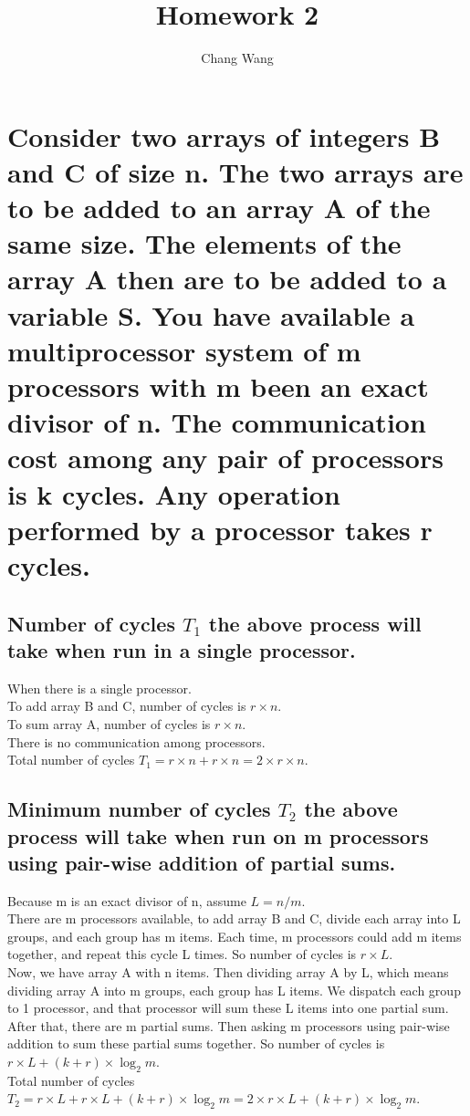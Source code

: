 \documentclass[12pt, a4paper]{report}
\title{Homework 2}
\author{Chang Wang}
\begin{document}
\maketitle

\section{Consider two arrays of integers B and C of size n. The two arrays are to be added to an array A of the same size. The elements of the array A then are to be added to a variable S. You have available a multiprocessor system of m processors with m been an exact divisor of n. The communication cost among any pair of processors is k cycles. Any operation performed by a processor takes r cycles.}

\subsection{Number of cycles $T_{1}$ the above process will take when run in a single processor.}

When there is a single processor. \\
To add array B and C, number of cycles is $r \times n$. \\
To sum array A, number of cycles is $r \times n$. \\
There is no communication among processors. \\
Total number of cycles $T_{1} = r \times n + r \times n = 2 \times r \times n$.

\subsection{Minimum number of cycles $T_{2}$ the above process will take when run on m processors using pair-wise addition of partial sums.}
Because m is an exact divisor of n, assume $L = n / m$. \\
There are m processors available, to add array B and C, divide each array into L groups, and each group has m items. Each time, m processors could add m items together, and repeat this cycle L times. So number of cycles is $r \times L$. \\
Now, we have array A with n items. Then dividing array A by L, which means dividing array A into m groups, each group has L items. We dispatch each group to 1 processor, and that processor will sum these L items into one partial sum. After that, there are m partial sums. Then asking m processors using pair-wise addition to sum these partial sums together. So number of cycles is $r \times L + (k+r) \times \log_{2} m$. \\
Total number of cycles $T_{2} = r \times L + r \times L + (k+r) \times \log_{2} m = 2 \times r \times L + (k+r) \times \log_{2} m$. \\
\end{document}
